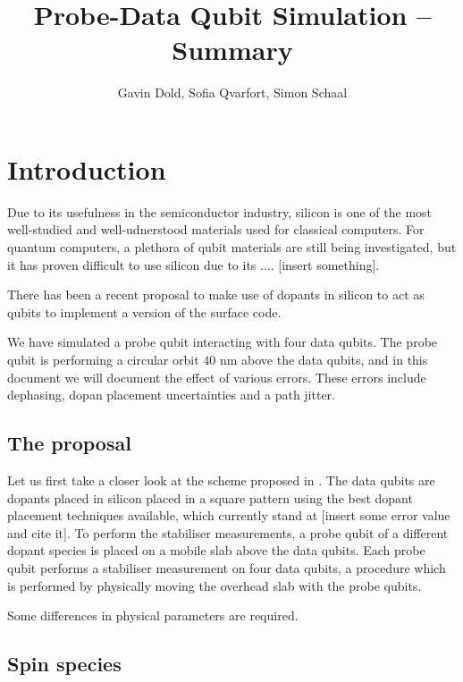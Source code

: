 



\usepackage{geometry}
\geometry{legalpaper, margin=1.0in}


\title{Probe-Data Qubit Simulation -- Summary}
\author{Gavin Dold, Sofia Qvarfort, Simon Schaal}
\maketitle
\tableofcontents
\section{Introduction}
Due to its usefulness in the semiconductor industry, silicon is one of the most well-studied and well-udnerstood materials used for classical computers. For quantum computers, a plethora of qubit materials are still being investigated, but it has proven difficult to use silicon due to its .... [insert something]. 

There has been a recent proposal to make use of dopants in silicon to act as qubits \cite{the paper} to implement a version of the surface code. 


We have simulated a probe qubit interacting with four data qubits. The probe qubit is performing a circular orbit $40$ nm above the data qubits, and in this document we will document the effect of various errors. These errors include dephasing, dopan placement uncertainties and a path jitter. 

\subsection{The proposal}
Let us first take a closer look at the scheme proposed in \cite{the paper}. The data qubits are dopants placed in silicon placed in a square pattern using the best dopant placement techniques available, which currently stand at [insert some error value and cite it]. To perform the stabiliser measurements, a probe qubit of a different dopant species is placed on a mobile slab above the data qubits. Each probe qubit performs a stabiliser measurement on four data qubits, a procedure which is performed by physically moving the overhead slab with the probe qubits. 

Some differences in physical parameters are required. 

\subsection{Spin species}



